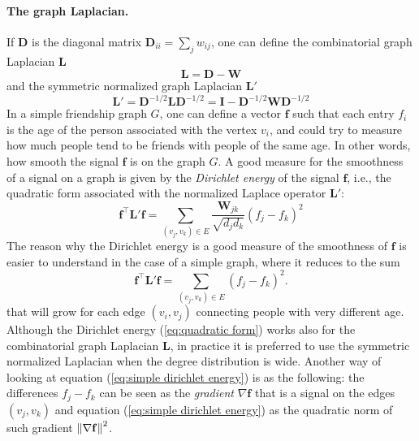 \paragraph{The graph Laplacian.}
If $\mathbf D$ is the diagonal matrix $\mathbf D_{ii} = \sum_j w_{ij}$, one can define \cite{Vandergheynst} the combinatorial graph Laplacian $\mathbf L$
\begin{equation}\label{eq:graph Laplacian}
		\mathbf L = \mathbf D-\mathbf W
\end{equation}
 and the symmetric normalized graph Laplacian $\mathbf L'$
\begin{equation}\label{eq:normalized graph Laplacian}
\mathbf L' =  \mathbf D^{-1/2}\mathbf L\mathbf D^{-1/2} = \mathbf I - \mathbf D^{-1/2}\mathbf W\mathbf D^{-1/2}
\end{equation}
In a simple friendship graph $G$, one can define a vector $\mathbf f$ such that each entry $ f_i$ is the age of the person associated with the vertex $v_i$, and could try to measure how much people tend to be friends with people of the same age. In other words, how smooth the signal $\mathbf f$ is on the graph $G$. A good measure for the smoothness of a signal on a graph is given by the \textit{Dirichlet energy} of the signal $\mathbf f$, i.e., the quadratic form associated with the normalized Laplace operator $\mathbf L'$:
\begin{equation}\label{eq:quadratic form}
	\mathbf f^\intercal \mathbf L' \mathbf f = \sum_{\left(v_{j}, v_{k}\right) \in {E}} \frac{\boldsymbol{W}_{j k}}{\sqrt{d_{j} {d}_{k}}}\left({f}_{j}-{f}_{k}\right)^{2}
\end{equation}
The reason why the Dirichlet energy is a good measure of the smoothness of $\mathbf f$ is easier to understand in the case of a simple graph, where it reduces to the sum
\begin{equation}\label{eq:simple dirichlet energy}
	\mathbf f^\intercal \mathbf L' \mathbf f = \sum_{\left(v_{j}, v_{k}\right) \in {E}} \left({f}_{j}-{f}_{k}\right)^{2}.
\end{equation}
 that will grow for each edge $(v_i, v_j)$ connecting people with very different age. Although the Dirichlet energy (\ref{eq:quadratic form}) works also for the combinatorial graph Laplacian $\mathbf L$, in practice it is preferred to use the symmetric normalized Laplacian when the degree distribution is wide. Another way of looking at equation (\ref{eq:simple dirichlet energy}) is as the following: the differences ${f}_j-{f}_k$ can be seen as the \textit{gradient} $\nabla \mathbf{f}$ that is a signal on the edges $(v_j, v_k)$ and equation (\ref{eq:simple dirichlet energy}) as the quadratic norm of such gradient $\left\lVert\nabla \mathbf{f}\right\rVert^2$.
